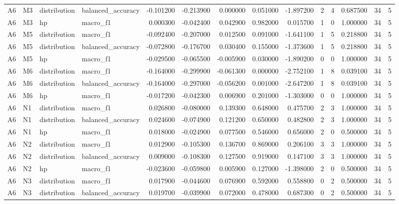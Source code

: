 \begin{table}
\begin{tabular}{llllrrrrrrrrrr}
A6 & M3 & distribution & balanced\_accuracy & -0.101200 & -0.213900 & 0.000000 & 0.051000 & -1.897200 & 2 & 4 & 0.687500 & 34 & 5 \\
A6 & M3 & hp & macro\_f1 & 0.000300 & -0.042400 & 0.042900 & 0.982000 & 0.015700 & 1 & 0 & 1.000000 & 34 & 5 \\
A6 & M5 & distribution & macro\_f1 & -0.092400 & -0.207000 & 0.012500 & 0.091000 & -1.641100 & 1 & 5 & 0.218800 & 34 & 5 \\
A6 & M5 & distribution & balanced\_accuracy & -0.072800 & -0.176700 & 0.030400 & 0.155000 & -1.373600 & 1 & 5 & 0.218800 & 34 & 5 \\
A6 & M5 & hp & macro\_f1 & -0.029500 & -0.065500 & -0.005900 & 0.030000 & -1.890200 & 0 & 0 & 1.000000 & 34 & 5 \\
A6 & M6 & distribution & macro\_f1 & -0.164000 & -0.299900 & -0.061300 & 0.000000 & -2.752100 & 1 & 8 & 0.039100 & 34 & 5 \\
A6 & M6 & distribution & balanced\_accuracy & -0.164000 & -0.297000 & -0.056200 & 0.001000 & -2.647200 & 1 & 8 & 0.039100 & 34 & 5 \\
A6 & M6 & hp & macro\_f1 & -0.017200 & -0.042300 & 0.006900 & 0.201000 & -1.303000 & 0 & 0 & 1.000000 & 34 & 5 \\
A6 & N1 & distribution & macro\_f1 & 0.026800 & -0.080000 & 0.139300 & 0.648000 & 0.475700 & 2 & 3 & 1.000000 & 34 & 5 \\
A6 & N1 & distribution & balanced\_accuracy & 0.024600 & -0.074900 & 0.121200 & 0.650000 & 0.482800 & 2 & 3 & 1.000000 & 34 & 5 \\
A6 & N1 & hp & macro\_f1 & 0.018000 & -0.024900 & 0.077500 & 0.546000 & 0.656000 & 2 & 0 & 0.500000 & 34 & 5 \\
A6 & N2 & distribution & macro\_f1 & 0.012900 & -0.105300 & 0.136700 & 0.869000 & 0.206100 & 3 & 3 & 1.000000 & 34 & 5 \\
A6 & N2 & distribution & balanced\_accuracy & 0.009000 & -0.108300 & 0.127500 & 0.919000 & 0.147100 & 3 & 3 & 1.000000 & 34 & 5 \\
A6 & N2 & hp & macro\_f1 & -0.023600 & -0.059800 & 0.005900 & 0.127000 & -1.398000 & 2 & 0 & 0.500000 & 34 & 5 \\
A6 & N3 & distribution & macro\_f1 & 0.017900 & -0.044600 & 0.076900 & 0.592000 & 0.558800 & 0 & 2 & 0.500000 & 34 & 5 \\
A6 & N3 & distribution & balanced\_accuracy & 0.019700 & -0.039900 & 0.072000 & 0.478000 & 0.687300 & 0 & 2 & 0.500000 & 34 & 5 \\

\end{tabular}
\end{table}
